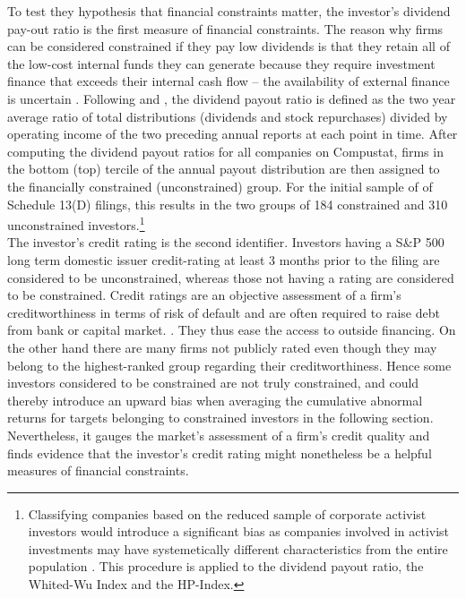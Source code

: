 \documentclass[12pt]{article}
\begin{document}
To test they hypothesis that financial constraints matter, the investor's dividend pay-out ratio is the first measure of financial constraints. The reason why firms can be considered constrained if they pay low dividends is that they retain all of the low-cost internal funds they can generate because they require investment finance that exceeds their internal cash flow  -- the availability of external finance is uncertain \citep[p.158]{Fazzari1988}. Following \citet{Almeida2004} and \citet[p.119]{Khatami2014}, the dividend payout ratio is defined as the two year average ratio of total distributions (dividends and stock repurchases) divided by operating income of the two preceding annual reports at each point in time. After computing the dividend payout ratios for all companies on Compustat, firms in the bottom (top) tercile of the annual payout distribution are then assigned to the financially constrained (unconstrained) group. For the initial sample of of Schedule 13(D) filings, this results in the two groups of 184 constrained and 310 unconstrained investors.\footnote{Classifying companies based on the reduced sample of corporate activist investors would introduce a significant bias as companies involved in activist investments may have systemetically different characteristics from the entire population \citep[p.109]{Khatami2014}. This procedure is applied to the dividend payout ratio, the Whited-Wu Index and the HP-Index.}\\
The investor's credit rating is the second identifier. Investors having a S\&P 500 long term domestic issuer credit-rating at least 3 months prior to the filing are considered to be unconstrained, whereas those not having a rating are considered to be constrained. Credit ratings are an objective assessment of a firm's creditworthiness in terms of risk of default and are often required to raise debt from bank or capital market. \citep[p.18]{heller2015}. They thus ease the access to outside financing. On the other hand there are many firms not publicly rated even though they may belong to the highest-ranked group regarding their creditworthiness. Hence some investors considered to be constrained are not truly constrained, and could thereby introduce an upward bias when averaging the cumulative abnormal returns for targets belonging to constrained investors in the following section. Nevertheless, it gauges the market's assessment of a firm's credit quality \citep[p.1790]{Almeida2004} and \citet[p.175]{heller2015} finds evidence that the investor's credit rating might nonetheless be a helpful measures of financial constraints.
\end{document}
